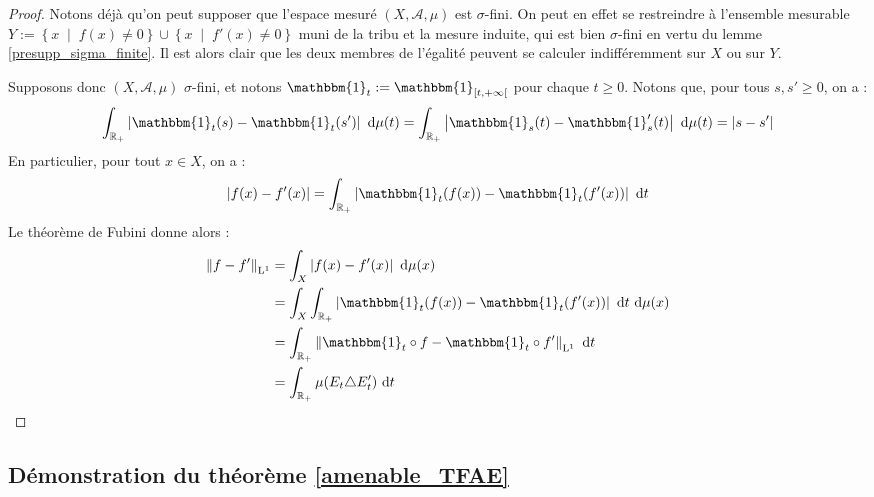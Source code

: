 \documentclass[a4paper,12pt]{article}
\newcommand{\R}{\mathbb{R}}
\newcommand{\norm}[1]{\left\Vert #1\right\Vert}
\newcommand{\abs}[1]{\left\vert#1\right\vert}
\newcommand{\set}[1]{\left\{ #1 \right\}}
\newcommand{\indic}{\mathbbm{1}}
\newcommand{\integral}[4]{\int_{#1}^{#2} #3~\mathrm{d}#4}
\newcommand{\tq}{\;\middle|\;}
\newcommand{\comp}{\circ}
\begin{document}
\begin{proof}
    Notons déjà qu'on peut supposer que l'espace mesuré $(X, \mathcal{A}, \mu)$ est $\sigma$-fini. On peut en effet 
    se restreindre à l'ensemble mesurable $Y := \set{x\tq f(x)\ne0} \cup \set{x\tq f'(x)\ne0}$ muni de la tribu et la mesure induite, 
    qui est bien $\sigma$-fini en vertu du lemme \ref{presupp_sigma_finite}. Il est alors clair que les deux membres 
    de l'égalité peuvent se calculer indifféremment sur $X$ ou sur $Y$.

    Supposons donc $(X, \mathcal{A}, \mu)$ $\sigma$-fini, et notons $\indic_t := \indic_{[t, +\infty[}$ pour chaque $t\geq0$.
    Notons que, pour tous $s, s'\geq0$, on a :
    \begin{equation*}
        \integral{\R_+}{}{\abs{\indic_t(s) - \indic_t(s')}}{\mu(t)} = \integral{\R_+}{}{\abs{\indic_s(t) - \indic_s'(t)}}{\mu(t)}  = \abs{s - s'}
    \end{equation*}
    En particulier, pour tout $x\in X$, on a :
    \begin{equation*}
        \abs{f(x) - f'(x)} = \integral{\R_+}{}{\abs{\indic_t(f(x)) - \indic_t(f'(x))}}{t}
    \end{equation*}
    Le théorème de Fubini donne alors :
    \begin{align*}
        \norm{f - f'}_{\mathrm{L}^1} 
            &= \integral{X}{}{\abs{f(x) - f'(x)}}{\mu(x)} \\
            &= \integral{X}{}{\integral{\R_+}{}{\abs{\indic_t(f(x)) - \indic_t(f'(x))}}{t}}{\mu(x)} \\
            &= \integral{\R_+}{}{\norm{\indic_t\comp f - \indic_t\comp f'}_{\mathrm{L}^1}}{t} \\
            &= \integral{\R_+}{}{\mu(E_t\triangle E'_t)}{t}
    \end{align*}
\end{proof}

\subsection{Démonstration du théorème \ref{amenable_TFAE}} 
\end{document}
